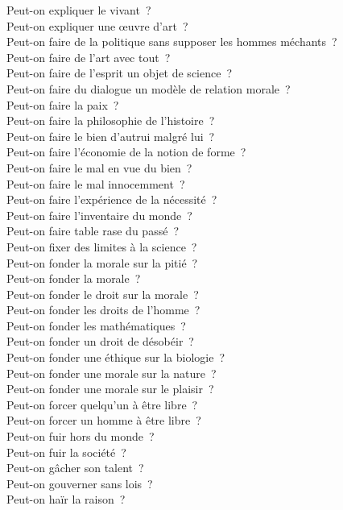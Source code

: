 \documentclass[a4paper,12pt]{article}
\begin{document}
Peut-on expliquer le vivant ? \\
Peut-on expliquer une œuvre d'art ? \\
Peut-on faire de la politique sans supposer les hommes méchants ? \\
Peut-on faire de l'art avec tout ? \\
Peut-on faire de l'esprit un objet de science ? \\
Peut-on faire du dialogue un modèle de relation morale ? \\
Peut-on faire la paix ? \\
Peut-on faire la philosophie de l'histoire ? \\
Peut-on faire le bien d'autrui malgré lui ? \\
Peut-on faire l'économie de la notion de forme ? \\
Peut-on faire le mal en vue du bien ? \\
Peut-on faire le mal innocemment ? \\
Peut-on faire l'expérience de la nécessité ? \\
Peut-on faire l'inventaire du monde ? \\
Peut-on faire table rase du passé ? \\
Peut-on fixer des limites à la science ? \\
Peut-on fonder la morale sur la pitié ? \\
Peut-on fonder la morale ? \\
Peut-on fonder le droit sur la morale ? \\
Peut-on fonder les droits de l'homme ? \\
Peut-on fonder les mathématiques ? \\
Peut-on fonder un droit de désobéir ? \\
Peut-on fonder une éthique sur la biologie ? \\
Peut-on fonder une morale sur la nature ? \\
Peut-on fonder une morale sur le plaisir ? \\
Peut-on forcer quelqu'un à être libre ? \\
Peut-on forcer un homme à être libre ? \\
Peut-on fuir hors du monde ? \\
Peut-on fuir la société ? \\
Peut-on gâcher son talent ? \\
Peut-on gouverner sans lois ? \\
Peut-on haïr la raison ? \\
\end{document}
